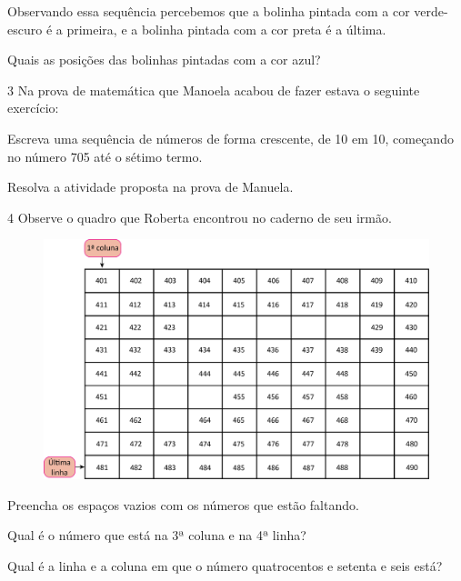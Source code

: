 Observando essa sequência percebemos que a bolinha pintada com a cor
verde-escuro é a primeira, e a bolinha pintada com a cor preta é a
última.

Quais as posições das bolinhas pintadas com a cor azul?


\num{3} Na prova de matemática que Manoela acabou de fazer estava o seguinte exercício:

\begin{myquote}
Escreva uma sequência de números de forma crescente, de 10 em 10, começando no número 705 até o sétimo termo.


\end{myquote}

Resolva a atividade proposta na prova de Manuela.
\pagebreak

\num{4} Observe o quadro que Roberta encontrou no caderno de seu irmão.

\begin{figure}[htpb!]
\includegraphics[width=\textwidth]{./media/image30.png}
\end{figure}

\begin{escolha}
\item Preencha os espaços vazios com os números que estão faltando.

\item Qual é o número que está na 3ª coluna e na 4ª linha?

\item Qual é a linha e a coluna em que o número quatrocentos e setenta e seis está?
\end{escolha}

